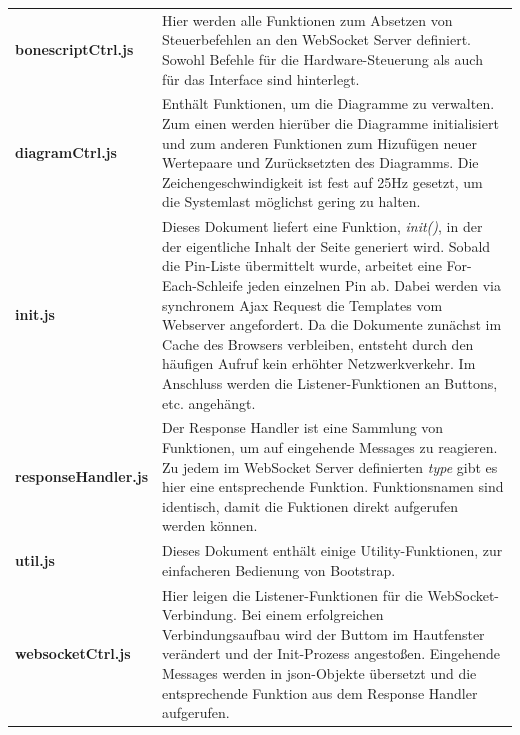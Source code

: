 \begin{longtabu} to \textwidth {
  X[1]
  X[3]}
  \textbf{bonescriptCtrl.js} & Hier werden alle Funktionen zum Absetzen von Steuerbefehlen an den WebSocket Server definiert. Sowohl Befehle für die Hardware-Steuerung als auch für das Interface sind hinterlegt.\newline\\
  
  \textbf{diagramCtrl.js} & Enthält Funktionen, um die Diagramme zu verwalten. Zum einen werden hierüber die Diagramme initialisiert und zum anderen Funktionen zum Hizufügen neuer Wertepaare und Zurücksetzten des Diagramms. Die Zeichengeschwindigkeit ist fest auf 25Hz gesetzt, um die Systemlast möglichst gering zu halten.\newline\\

  \textbf{init.js} & Dieses Dokument liefert eine Funktion, \textit{init()}, in der der eigentliche Inhalt der Seite generiert wird. Sobald die Pin-Liste übermittelt wurde, arbeitet eine For-Each-Schleife jeden einzelnen Pin ab. Dabei werden via synchronem Ajax Request die Templates vom Webserver angefordert. Da die Dokumente zunächst im Cache des Browsers verbleiben, entsteht durch den häufigen Aufruf kein erhöhter Netzwerkverkehr. Im Anschluss werden die Listener-Funktionen an Buttons, etc. angehängt.\newline\\

  \textbf{responseHandler.js} & Der Response Handler ist eine Sammlung von Funktionen, um auf eingehende Messages zu reagieren. Zu jedem im WebSocket Server definierten \textit{type} gibt es hier eine entsprechende Funktion. Funktionsnamen sind identisch, damit die Fuktionen direkt aufgerufen werden können.\newline\\

  \textbf{util.js} & Dieses Dokument enthält einige Utility-Funktionen, zur einfacheren Bedienung von Bootstrap.\newline\\

  \textbf{websocketCtrl.js} & Hier leigen die Listener-Funktionen für die WebSocket-Verbindung. Bei einem erfolgreichen Verbindungsaufbau wird der Buttom im Hautfenster verändert und der Init-Prozess angestoßen. Eingehende Messages werden in \gls{json}-Objekte übersetzt und die entsprechende Funktion aus dem Response Handler aufgerufen.\newline\\
\end{longtabu}


